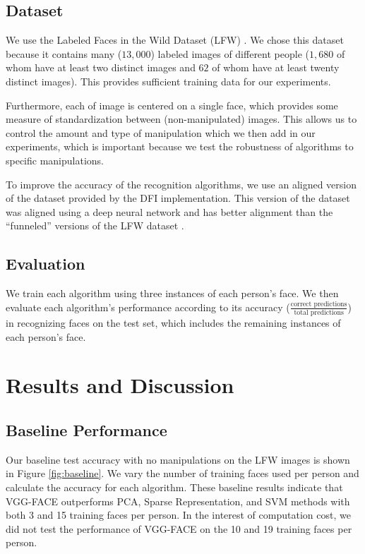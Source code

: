 \documentclass[pageno]{cos429}
\begin{document}
\subsection{Dataset}\label{sec:data}
We use the Labeled Faces in the Wild Dataset (LFW) \cite{huang_labeled_2007}. We chose this dataset because it contains many ($13,000$) labeled images of different people ($1,680$ of whom have at least two distinct images and $62$ of whom have at least twenty distinct images). This provides sufficient training data for our experiments.

Furthermore, each of image is centered on a single face, which provides some measure of standardization between (non-manipulated) images. This allows us to control the amount and type of manipulation which we then add in our experiments, which is important because we test the robustness of algorithms to specific manipulations.

To improve the accuracy of the recognition algorithms, we use an aligned version of the dataset provided by the DFI implementation. This version of the dataset was aligned using a deep neural network and has better alignment than the ``funneled'' versions of the LFW dataset \cite{noauthor_lfw_nodate}.

\subsection{Evaluation}
We train each algorithm using three instances of each person's face. We then evaluate each algorithm's performance according to its accuracy ($\frac{\textrm{correct predictions}}{\textrm{total predictions}}$) in recognizing faces on the test set, which includes the remaining instances of each person's face.

\section{Results and Discussion}
\subsection*{Baseline Performance}
Our baseline test accuracy with no manipulations on the LFW images is shown in Figure \ref{fig:baseline}. We vary the number of training faces used per person and calculate the accuracy for each algorithm. These baseline results indicate that VGG-FACE outperforms PCA, Sparse Representation, and SVM methods with both 3 and 15 training faces per person. In the interest of computation cost, we did not test the performance of VGG-FACE on the 10 and 19 training faces per person.
\end{document}
